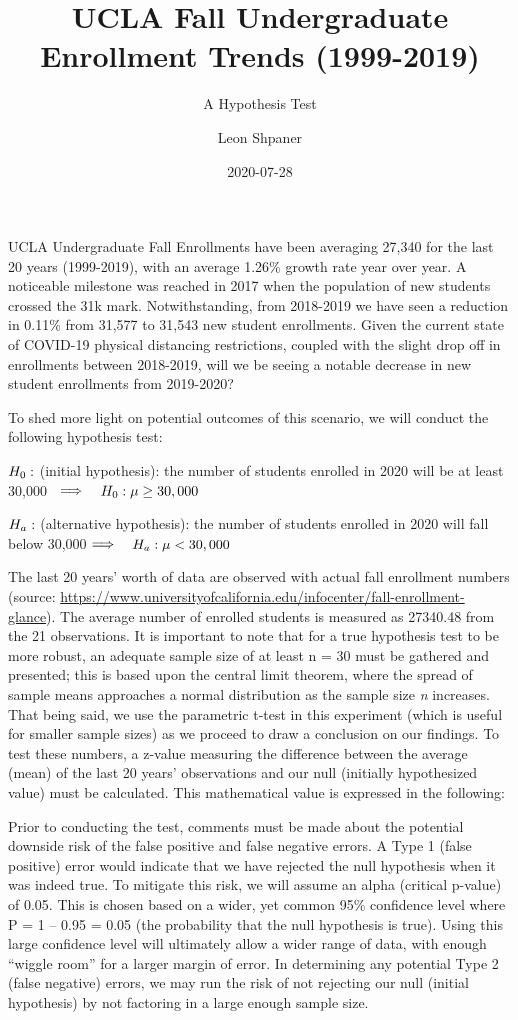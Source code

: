 \documentclass[
]{article}
\title{UCLA Fall Undergraduate Enrollment Trends (1999-2019)}
\subtitle{A Hypothesis Test}
\author{Leon Shpaner}
\date{2020-07-28}
\begin{document}
\maketitle

UCLA Undergraduate Fall Enrollments have been averaging 27,340 for the
last 20 years (1999-2019), with an average 1.26\% growth rate year over
year. A noticeable milestone was reached in 2017 when the population of
new students crossed the 31k mark. Notwithstanding, from 2018-2019 we
have seen a reduction in 0.11\% from 31,577 to 31,543 new student
enrollments. Given the current state of COVID-19 physical distancing
restrictions, coupled with the slight drop off in enrollments between
2018-2019, will we be seeing a notable decrease in new student
enrollments from 2019-2020?

To shed more light on potential outcomes of this scenario, we will
conduct the following hypothesis test:

\(\small{H_0:}\) (initial hypothesis): the number of students enrolled
in 2020 will be at least 30,000
\({\large\hspace{2mm}\Longrightarrow{\hspace{2mm}}}\)
\(\small {H_0: \mu \geq 30,000}\)

\(\small{H_a:}\) (alternative hypothesis): the number of students
enrolled in 2020 will fall below 30,000
\({\large\Longrightarrow{\hspace{2mm}}}\) \(\small {H_a: \mu < 30,000}\)

The last 20 years' worth of data are observed with actual fall
enrollment numbers (source:
\url{https://www.universityofcalifornia.edu/infocenter/fall-enrollment-glance}).
The average number of enrolled students is measured as 27340.48 from the
21 observations. It is important to note that for a true hypothesis test
to be more robust, an adequate sample size of at least n = 30 must be
gathered and presented; this is based upon the central limit theorem,
where the spread of sample means approaches a normal distribution as the
sample size \emph{n} increases. That being said, we use the parametric
t-test in this experiment (which is useful for smaller sample sizes) as
we proceed to draw a conclusion on our findings. To test these numbers,
a z-value measuring the difference between the average (mean) of the
last 20 years' observations and our null (initially hypothesized value)
must be calculated. This mathematical value is expressed in the
following:

Prior to conducting the test, comments must be made about the potential
downside risk of the false positive and false negative errors. A Type 1
(false positive) error would indicate that we have rejected the null
hypothesis when it was indeed true. To mitigate this risk, we will
assume an alpha (critical p-value) of 0.05. This is chosen based on a
wider, yet common 95\% confidence level where P = 1 -- 0.95 = 0.05 (the
probability that the null hypothesis is true). Using this large
confidence level will ultimately allow a wider range of data, with
enough ``wiggle room'' for a larger margin of error. In determining any
potential Type 2 (false negative) errors, we may run the risk of not
rejecting our null (initial hypothesis) by not factoring in a large
enough sample size.
\end{document}

